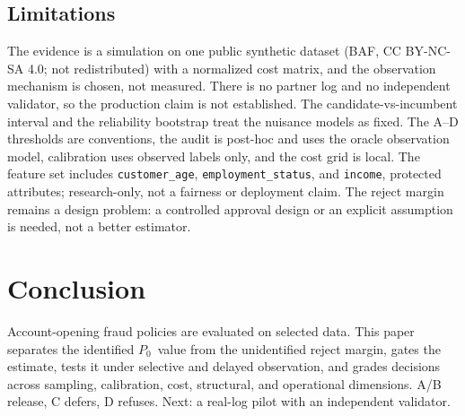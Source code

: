 \documentclass[conference]{IEEEtran}
\newcommand{\Pzero}{\ensuremath{P_0}}
\begin{document}
\subsection{Limitations}
The evidence is a simulation on one public synthetic dataset (BAF, CC BY-NC-SA 4.0; not redistributed) with a normalized cost matrix, and the observation mechanism is chosen, not measured. There is no partner log and no independent validator, so the production claim is not established. The candidate-vs-incumbent interval and the reliability bootstrap treat the nuisance models as fixed. The A--D thresholds are conventions, the audit is post-hoc and uses the oracle observation model, calibration uses observed labels only, and the cost grid is local. The feature set includes \texttt{customer\_age}, \texttt{employment\_status}, and \texttt{income}, protected attributes; research-only, not a fairness or deployment claim. The reject margin remains a design problem: a controlled approval design or an explicit assumption is needed, not a better estimator.

\section{Conclusion}
Account-opening fraud policies are evaluated on selected data. This paper separates the identified \Pzero\ value from the unidentified reject margin, gates the estimate, tests it under selective and delayed observation, and grades decisions across sampling, calibration, cost, structural, and operational dimensions. A/B release, C defers, D refuses. Next: a real-log pilot with an independent validator.



\end{document}
